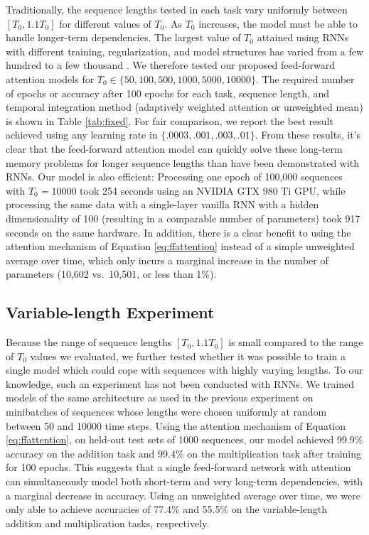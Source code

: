 \documentclass{article} %
\begin{document}
Traditionally, the sequence lengths tested in each task vary uniformly between $[T_0, 1.1T_0]$ for different values of $T_0$.
As $T_0$ increases, the model must be able to handle longer-term dependencies.
The largest value of $T_0$ attained using RNNs with different training, regularization, and model structures has varied from a few hundred \cite{martens2011learning,sutskever2013importance,le2015simple,krueger2015regularizing,arjovsky2015unitary} to a few thousand \cite{hochreiter1997long,jaegar2012long}.
We therefore tested our proposed feed-forward attention models for $T_0 \in \{50, 100, 500, 1000, 5000, 10000\}$.
The required number of epochs or accuracy after 100 epochs for each task, sequence length, and temporal integration method (adaptively weighted attention or unweighted mean) is shown in Table \ref{tab:fixed}.
For fair comparison, we report the best result achieved using any learning rate in $\{.0003, .001, .003, .01\}$.
From these results, it's clear that the feed-forward attention model can quickly solve these long-term memory problems for longer sequence lengths than have been demonstrated with RNNs.
Our model is also efficient: Processing one epoch of 100,000 sequences with $T_0 = 10000$ took 254 seconds using an NVIDIA GTX 980 Ti GPU, while processing the same data with a single-layer vanilla RNN with a hidden dimensionality of 100 (resulting in a comparable number of parameters) took 917 seconds on the same hardware.
In addition, there is a clear benefit to using the attention mechanism of Equation \ref{eq:ffattention} instead of a simple unweighted average over time, which only incurs a marginal increase in the number of parameters (10,602 vs.\ 10,501, or less than 1\%).

\subsection{Variable-length Experiment}

Because the range of sequence lengths $[T_0, 1.1T_0]$ is small compared to the range of $T_0$ values we evaluated, we further tested whether it was possible to train a single model which could cope with sequences with highly varying lengths.
To our knowledge, such an experiment has not been conducted with RNNs.
We trained models of the same architecture as used in the previous experiment on minibatches of sequences whose lengths were chosen uniformly at random between 50 and 10000 time steps.
Using the attention mechanism of Equation \ref{eq:ffattention}, on held-out test sets of 1000 sequences, our model achieved 99.9\% accuracy on the addition task and 99.4\% on the multiplication task after training for 100 epochs.
This suggests that a single feed-forward network with attention can simultaneously model both short-term and very long-term dependencies, with a marginal decrease in accuracy.
Using an unweighted average over time, we were only able to achieve accuracies of 77.4\% and 55.5\% on the variable-length addition and multiplication tasks, respectively.
\end{document}
